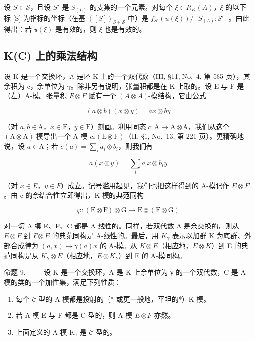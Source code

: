 设 \(S \in \mathscr{S}\)，且设 \(S'\) 是 \(S_{(L)}\) 的支集的一个元素。对每个 \(\xi \in R_K(A)\)，\(\xi\) 的以下标 {[}S{]} 为指标的坐标（在基 \(([S])_{S \in \mathscr{S}}\) 中）是 \(f_{S'}(u(\xi)) / [S_{(L)} : S']\)。由此得出：若 \(u(\xi)\) 是有效的，则 \(\xi\) 也是有效的。

\subsection{K(C) 上的乘法结构}

设 K 是一个交换环，A 是环 K 上的一个双代数（III, §11, No.~4, 第 585 页），其余积为 c，余单位为 \(\gamma\)。除非另有说明，张量积都是在 K 上取的。设 E 与 F 是（左）A-模。张量积 \(E \otimes F\) 赋有一个 \((A \otimes A)\)-模结构，它由公式

\[
(a \otimes b) (x \otimes y) = a x \otimes b y\tag{11}
\]

（对 \(a, b \in \mathrm{A}\)，\(x \in \mathrm{E}\)，\(y \in \mathrm{F}\)）刻画。利用同态 \(c: \mathrm{A} \to \mathrm{A} \otimes \mathrm{A}\)，我们从这个 \((\mathrm{A} \otimes \mathrm{A})\)-模导出一个 A-模 \(c_*(\mathrm{E} \otimes \mathrm{F})\)（II, §1, No.~13, 第 221 页）。更精确地说，设 \(a \in \mathrm{A}\)；若 \(c(a) = \sum_{i} a_{i} \otimes b_{i}\)，则我们有

\[
a (x \otimes y) = \sum_ {i} a _ {i} x \otimes b _ {i} y\tag{12}
\]

（对 \(x \in E\)，\(y \in F\)）成立。记号滥用起见，我们也把这样得到的 A-模记作 \(E \otimes F\)。由 c 的余结合性立即得出，K-模的典范同构

\[
\varphi : (\mathrm{E} \otimes \mathrm{F}) \otimes \mathrm{G} \longrightarrow \mathrm{E} \otimes (\mathrm{F} \otimes \mathrm{G})
\]

对一切 A-模 E、F、G 都是 A-线性的。同样，若双代数 A 是余交换的，则从 \(E \otimes F\) 到 \(F \otimes E\) 的典范同构是 A-线性的。最后，用 \(K_{\gamma}\) 表示以加群 K 为底群、外部合成律为 \((a, x) \mapsto \gamma(a)x\) 的 A-模。从 \(K \otimes E\)（相应地，\(E \otimes K\)）到 E 的典范同构是从 \(K_{\gamma} \otimes E\)（相应地，\(E \otimes K_{\gamma}\)）到 E 的 A-模同构。

命题 9. —— 设 K 是一个交换环，A 是 K 上余单位为 γ 的一个双代数，C 是 A-模的类的一个加性集，满足下列性质：

\begin{enumerate}
\def\labelenumi{(\roman{enumi})}
\item
  每个 \(\mathcal{C}\) 型的 A-模都是投射的（* 或更一般地，平坦的*）K-模。
\item
  若 A-模 E 与 F 都是 C 型的，则 A-模 \(E \otimes F\) 亦然。
\item
  上面定义的 A-模 \(\mathrm{K}_{\gamma}\) 是 \(\mathcal{C}\) 型的。
\end{enumerate}

